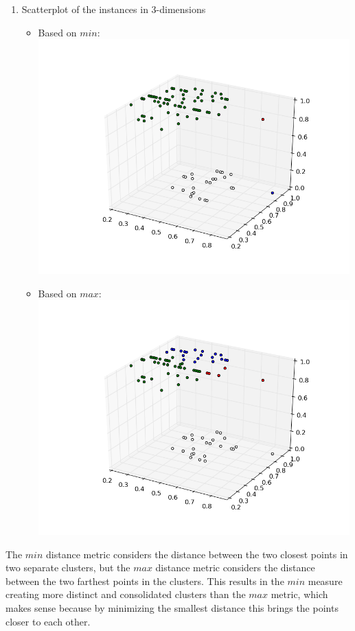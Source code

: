 \documentclass[11pt]{article}
\begin{document}
\begin{enumerate}[a.]
\begin{enumerate}
\begin{enumerate}
\begin{tabular}{|c|c|c|c|c|}
\hline
\end{tabular}
\item Scatterplot of the instances in 3-dimensions
	\begin{itemize}
	\item Based on $min$:\\
	\includegraphics[width=120mm]{graphhac.png}
	\item Based on $max$:\\
	\includegraphics[width=120mm]{graphhacmax.png}
	\end{itemize}
\end{enumerate}
The $min$ distance metric considers the distance between the two closest points in two separate clusters, but the $max$ distance metric considers the distance between the two farthest points in the clusters. This results in the $min$ measure creating more distinct and consolidated clusters than the $max$ metric, which makes sense because by minimizing the smallest distance this brings the points closer to each other.

\end{enumerate}
\end{enumerate}
\end{document}
